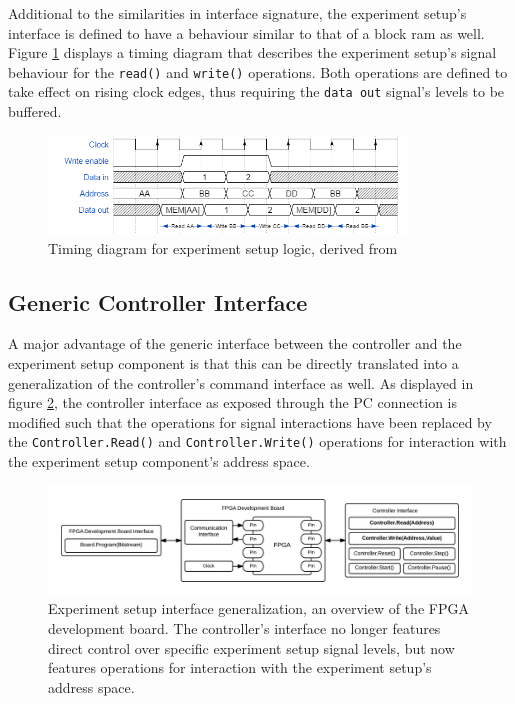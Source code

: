 \documentclass[main.tex]{subfiles}
\begin{document}
Additional to the similarities in interface signature, the experiment setup's interface is defined to have a behaviour similar to that of a block ram as well. Figure \ref{fig:timing-bram} displays a timing diagram that describes the experiment setup's signal behaviour for the \texttt{read()} and \texttt{write()} operations. Both operations are defined to take effect on rising clock edges, thus requiring the \texttt{data out} signal's levels to be buffered. 

\begin{figure}[h]
    \caption{Timing diagram for experiment setup logic, derived from \cite[Fig.1-2]{ug473}}
    \label{fig:timing-bram}
    \centering
    \includegraphics[width=0.85\textwidth]{img/timing-bram}
\end{figure}

\subsection{Generic Controller Interface}
A major advantage of the generic interface between the controller and the experiment setup component is that this can be directly translated into a generalization of the controller's command interface as well. As displayed in figure \ref{fig:overview-abstract}, the controller interface as exposed through the PC connection is modified such that the operations for signal interactions have been replaced by the \texttt{Controller.Read()} and \texttt{Controller.Write()} operations for interaction with the experiment setup component's address space. 

\begin{figure}[h]
\centering
\caption{Experiment setup interface generalization, an overview of the FPGA development board. The controller's interface no longer features direct control over specific experiment setup signal levels, but now features operations for interaction with the experiment setup's address space.}
\label{fig:overview-abstract}
\includegraphics[width=\textwidth]{img/overview-abstract}
\end{figure}
\end{document}

